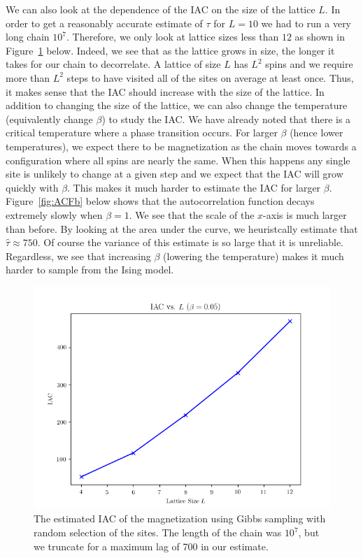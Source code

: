 \documentclass[11pt,a4paper]{amsart}
\begin{document}
\par We can also look at the dependence of the IAC on the size of the lattice $L$.  In order to get a reasonably accurate estimate of $\tau$ for $L=10$ we had to run a very long chain $10^7$.  Therefore, we only look at lattice sizes less than $12$ as shown in Figure~\ref{fig:IACL} below.  Indeed, we see that as the lattice grows in size, the longer it takes for our chain to decorrelate.  A lattice of size $L$ has $L^2$ spins and we require more than $L^2$ steps to have visited all of the sites on average at least once.  Thus, it makes sense that the IAC should increase with the size of the lattice.  In addition to changing the size of the lattice, we can also change the temperature (equivalently change $\beta$) to study the IAC.  We have already noted that there is a critical temperature where a phase transition occurs.  For larger $\beta$ (hence lower temperatures), we expect there to be magnetization as the chain moves towards a configuration where all spins are nearly the same.  When this happens any single site is unlikely to change at a given step and we expect that the IAC will grow quickly with $\beta$.  This makes it much harder to estimate the IAC for larger $\beta$.  Figure~\ref{fig:ACFb} below shows that the autocorrelation function decays extremely slowly when $\beta=1$.  We see that the scale of the $x$-axis is much larger than before.  By looking at the area under the curve, we heuristcally estimate that $\hat{\tau} \approx 750$.  Of course the variance of this estimate is so large that it is unreliable.  Regardless, we see that increasing $\beta$ (lowering the temperature) makes it much harder to sample from the Ising model.




\begin{figure}[H]
\centering
\includegraphics[width=5in]{IACL.png}
\caption{The estimated IAC of the magnetization using Gibbs sampling with random selection of the sites.  The length of the chain was $10^7$, but we truncate for a maximum lag of 700 in our estimate.}
\label{fig:IACL}
\end{figure}
\end{document}
